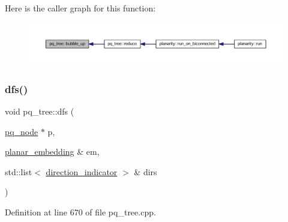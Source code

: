 Here is the caller graph for this function\+:\nopagebreak
\begin{figure}[H]
\begin{center}
\leavevmode
\includegraphics[width=350pt]{classpq__tree_a109cb910dcb75d3e196a46f5174406c7_icgraph}
\end{center}
\end{figure}
\mbox{\label{classpq__tree_a60d97d712c79b072693f75de3f0d328e}} 
\subsubsection{\texorpdfstring{dfs()}{dfs()}}
{\footnotesize\ttfamily void pq\+\_\+tree\+::dfs (\begin{DoxyParamCaption}\item[{\mbox{\hyperlink{classpq__node}{pq\+\_\+node}} $\ast$}]{p,  }\item[{\mbox{\hyperlink{classplanar__embedding}{planar\+\_\+embedding}} \&}]{em,  }\item[{std\+::list$<$ \mbox{\hyperlink{classdirection__indicator}{direction\+\_\+indicator}} $>$ \&}]{dirs }\end{DoxyParamCaption})\hspace{0.3cm}{\ttfamily [private]}}



Definition at line 670 of file pq\+\_\+tree.\+cpp.


